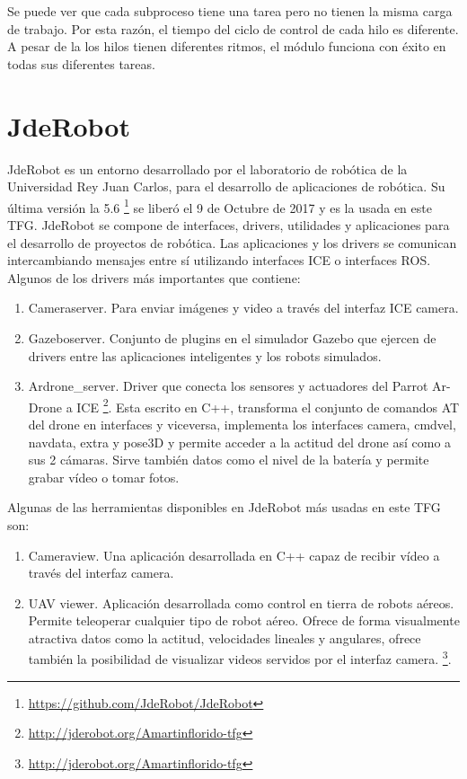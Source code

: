 Se puede ver que cada subproceso tiene una tarea pero no tienen la misma carga de trabajo.
Por esta razón, el tiempo del ciclo de control de cada hilo es diferente. A pesar de la los hilos tienen diferentes ritmos, el módulo funciona con éxito en todas sus diferentes tareas.

\section{JdeRobot}
\label{sec:jderobot}

JdeRobot\cite{jderobot} es un entorno desarrollado por el laboratorio de robótica de la Universidad Rey Juan Carlos, para el desarrollo de aplicaciones de robótica. Su última versión la 5.6 \footnote{\url{https://github.com/JdeRobot/JdeRobot}} se liberó el 9 de Octubre de 2017 y es la usada en este TFG. JdeRobot se compone de interfaces, drivers, utilidades y aplicaciones para el desarrollo de proyectos de robótica. Las aplicaciones y los drivers se comunican intercambiando mensajes entre sí utilizando interfaces ICE o interfaces ROS.
Algunos de los drivers más importantes que contiene:
\begin{enumerate}
\item Cameraserver. Para enviar imágenes y video a través del interfaz ICE camera.
\item Gazeboserver. Conjunto de plugins en el simulador Gazebo que ejercen de drivers entre las aplicaciones inteligentes y los robots simulados.
\item Ardrone\_server. Driver que conecta los sensores y actuadores del Parrot Ar-Drone a ICE \footnote{\url{http://jderobot.org/Amartinflorido-tfg}}. Esta escrito en C++, transforma el conjunto de comandos AT del drone en interfaces y viceversa, implementa los interfaces camera, cmdvel, navdata, extra y pose3D y permite acceder a la actitud del drone así como a sus 2 cámaras. Sirve también datos como el nivel de la batería y permite grabar vídeo o tomar fotos.
\end{enumerate}
Algunas de las herramientas disponibles en JdeRobot más usadas en este TFG son:
\begin{enumerate}
\item Cameraview. Una aplicación desarrollada en C++ capaz de recibir vídeo a través del interfaz camera.
\item UAV viewer. Aplicación desarrollada como control en tierra de robots aéreos. Permite teleoperar cualquier tipo de robot aéreo. Ofrece de forma visualmente atractiva datos como la actitud, velocidades lineales y angulares, ofrece también la posibilidad de visualizar videos servidos por el interfaz camera. \footnote{\url{http://jderobot.org/Amartinflorido-tfg}}.
\end{enumerate}

